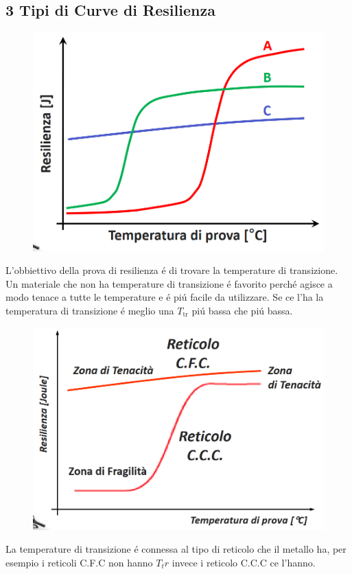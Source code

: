\documentclass{article}
\begin{document}
{        \subsection{3 Tipi di Curve di Resilienza}
            \begin{figure}[!h]
                \centering
                \includegraphics[width=.85\linewidth]{Tipi di Curve di Prova di Resilienza.png}
            \end{figure}
            L'obbiettivo della prova di resilienza \'e di trovare la temperature di transizione.
            Un materiale che non ha temperature di transizione \'e favorito perch\'e agisce a modo tenace a tutte le temperature e \'e pi\'u facile da utilizzare. Se ce l'ha la temperatura di transizione \'e meglio una $T_\text{tr}$ pi\'u bassa che pi\'u bassa.
            \newpage
            \begin{figure}[!h]
                \centering
                \includegraphics[width=.85\linewidth]{Tipi di Curve di Prova di Resilienza basato sul tipo di reticolo.png}
            \end{figure}
            La temperature di transizione \'e connessa al tipo di reticolo che il metallo ha, per esempio i reticoli C.F.C non hanno $T_tr$ invece i reticolo C.C.C ce l'hanno.
}
\end{document}
